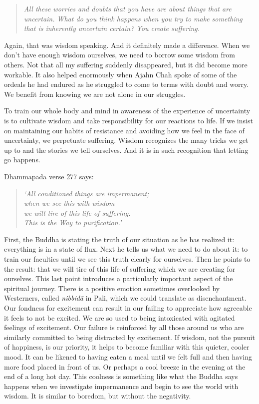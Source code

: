 \begin{quote}
\itshape
All these worries and doubts that you have are about things that are
uncertain. What do you think happens when you try to make something that is
inherently uncertain certain? You create suffering.
\end{quote}

Again, that was wisdom speaking. And it definitely made a difference. When we
don't have enough wisdom ourselves, we need to borrow some wisdom from others.
Not that all my suffering suddenly disappeared, but it did become more workable.
It also helped enormously when Ajahn Chah spoke of some of the ordeals he had
endured as he struggled to come to terms with doubt and worry. We benefit from
knowing we are not alone in our struggles.

To train our whole body and mind in awareness of the experience of
uncertainty is to cultivate wisdom and take responsibility for our
reactions to life. If we insist on maintaining our habits of resistance
and avoiding how we feel in the face of uncertainty, we perpetuate
suffering. Wisdom recognizes the many tricks we get up to and the
stories we tell ourselves. And it is in such recognition that letting go
happens.

\clearpage

Dhammapada verse 277 says:

\begin{quote}
{\itshape `All conditioned things are impermanent;\\
when we see this with wisdom\\
we will tire of this life of suffering.\\
This is the Way to purification.'}\thinspace \cite{dhammapada}
\end{quote}

First, the Buddha is stating the truth of our situation as he has
realized it: everything is in a state of flux. Next he tells us what we
need to do about it: to train our faculties until we see this truth
clearly for ourselves. Then he points to the result: that we will tire
of this life of suffering which we are creating for ourselves. This last
point introduces a particularly important aspect of the spiritual
journey. There is a positive emotion sometimes overlooked by
Westerners, called \emph{nibbidā} in Pali, which we could translate as
disenchantment. Our fondness for excitement can result in our failing to
appreciate how agreeable it feels to not be excited. We are so used
to being intoxicated with agitated feelings of excitement. Our failure
is reinforced by all those around us who are similarly committed to
being distracted by excitement. If wisdom, not the pursuit of happiness,
is our priority, it helps to become familiar with this quieter, cooler
mood. It can be likened to having eaten a meal until we felt full and
then having more food placed in front of us. Or perhaps a cool breeze in
the evening at the end of a long hot day. This coolness is something
like what the Buddha says happens when we investigate impermanence and
begin to see the world with wisdom. It is similar to boredom, but
without the negativity.

